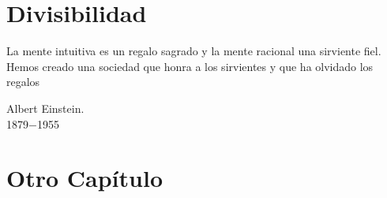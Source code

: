 \documentclass{book}
\begin{document}
\chapter{Divisibilidad }

\epigraph{La mente intuitiva es un regalo sagrado y la mente racional una sirviente fiel. Hemos creado una sociedad que honra a los sirvientes y que ha olvidado los regalos}{Albert Einstein.\\1879$-$1955}

\chapter{Otro Capítulo}
\end{document}
